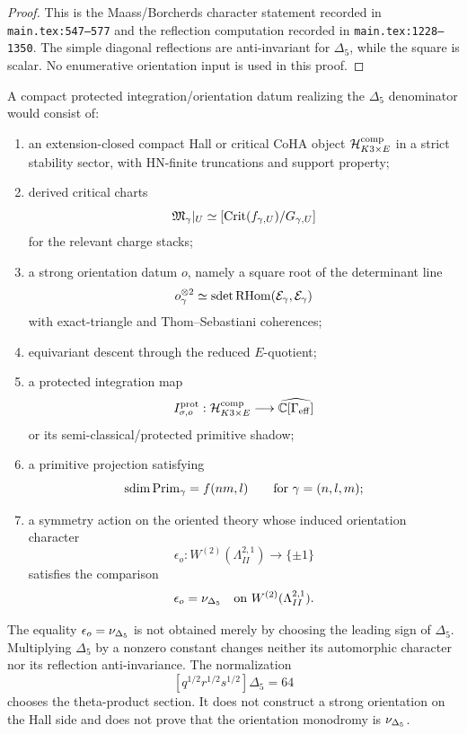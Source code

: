 \begin{proof}
This is the Maass/Borcherds character statement recorded in
\texttt{main.tex:547--577} and the reflection computation recorded in
\texttt{main.tex:1228--1350}.  The simple diagonal reflections are
anti-invariant for \(\Delta_5\), while the square is scalar.  No
enumerative orientation input is used in this proof.
\end{proof}

\begin{definition}
\label{def:protected-orientation-matching-datum}
A compact protected integration/orientation datum realizing the
\(\Delta_5\) denominator would consist of:

\begin{enumerate}
\item an extension-closed compact Hall or critical CoHA object
\(\mathcal H_{K3\times E}^{\mathrm{comp}}\) in a strict stability sector,
with HN-finite truncations and support property;
\item derived critical charts
\[
  \mathfrak M_\gamma|_U\simeq[\operatorname{Crit}(f_{\gamma,U})/G_{\gamma,U}]
\]
for the relevant charge stacks;
\item a strong orientation datum \(o\), namely a square root of the
determinant line
\[
  o_\gamma^{\otimes 2}
  \simeq
  \operatorname{sdet}\operatorname{RHom}(\mathcal E_\gamma,\mathcal E_\gamma)
\]
with exact-triangle and Thom--Sebastiani coherences;
\item equivariant descent through the reduced \(E\)-quotient;
\item a protected integration map
\[
  I^{\mathrm{prot}}_{\sigma,o}:
  \mathcal H_{K3\times E}^{\mathrm{comp}}
  \longrightarrow
  \widehat{\mathbb C[\Gamma_{\mathrm{eff}}]}
\]
or its semi-classical/protected primitive shadow;
\item a primitive projection satisfying
\[
  \operatorname{sdim} \operatorname{Prim}_\gamma=f(nm,l)
  \qquad
  \text{for }\gamma=(n,l,m);
\]
\item a symmetry action on the oriented theory whose induced
orientation character
\[
  \epsilon_o:W^{(2)}(\Lambda^{2,1}_{II})\longrightarrow\{\pm1\}
\]
satisfies the comparison
\[
  \epsilon_o=\nu_{\Delta_5}
  \quad\text{on }W^{(2)}(\Lambda^{2,1}_{II}).
\]
\end{enumerate}
\end{definition}

\begin{proposition}
\label{prop:not-normalization-choice}
The equality \(\epsilon_o=\nu_{\Delta_5}\) is not obtained merely by choosing
the leading sign of \(\Delta_5\).  Multiplying \(\Delta_5\) by a nonzero
constant changes neither its automorphic character nor its reflection
anti-invariance.  The normalization
\[
  [q^{1/2}r^{1/2}s^{1/2}]\Delta_5=64
\]
chooses the theta-product section.  It does not construct a strong
orientation on the Hall side and does not prove that the orientation
monodromy is \(\nu_{\Delta_5}\).
\end{proposition}


